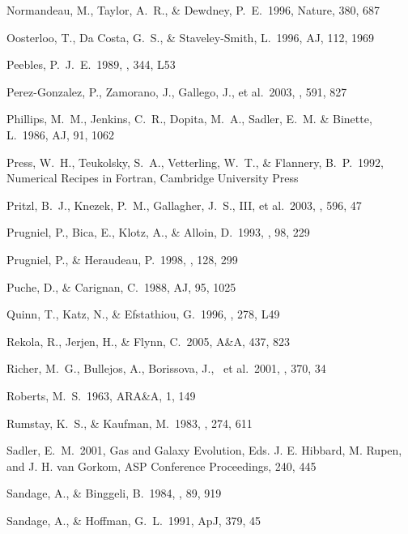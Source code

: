 \documentclass[12pt,onecolumn]{emulateapj}
\begin{document}
\begin{thebibliography}{}
Normandeau, M., Taylor, A.~R., \& Dewdney, P.~E.\ 1996, Nature, 380, 687

Oosterloo, T., Da Costa, G.~S., \& Staveley-Smith, L.\ 1996, AJ, 112, 1969

Peebles, P.~J.~E.\ 1989, \apjl, 344, L53 

Perez-Gonzalez, P., Zamorano, J., Gallego, J., et al.\ 2003, \apj, 591, 827 

Phillips, M.~M., Jenkins, C.~R., Dopita, M.~A., Sadler, E.~M. \& Binette, L.\ 1986, AJ, 91, 1062

Press, W.~H., Teukolsky, S.~A., Vetterling, W.~T., \& Flannery, B.~P.\ 1992,
Numerical Recipes in Fortran, Cambridge University Press

Pritzl, B.~J., Knezek, P.~M., Gallagher, J.~S., III, et al.\ 2003, \apj, 596, 47

Prugniel, P., Bica, E., Klotz, A., \& Alloin, D.\ 1993, \aaps, 98, 229 

Prugniel, P., \& Heraudeau, P.\ 1998, \aaps, 128, 299 

Puche, D., \& Carignan, C.\ 1988, AJ, 95, 1025

Quinn, T., Katz, N., \& Efstathiou, G.\ 1996, \mnras, 278, L49 

Rekola, R., Jerjen, H., \& Flynn, C.\ 2005, A\&A, 437, 823

Richer, M.~G., Bullejos, A., Borissova, J., ~et al.\ 2001, \aap, 370, 34 

Roberts, M.~S.\ 1963, ARA\&A, 1, 149

Rumstay, K.~S., \& Kaufman, M.\ 1983, \apj, 274, 611 

Sadler, E.~M.\ 2001, Gas and Galaxy Evolution, 
Eds. J. E. Hibbard, M. Rupen, and J. H. van Gorkom,
ASP Conference Proceedings, 240, 445 

Sandage, A., \& Binggeli, B.\ 1984, \aj, 89, 919

Sandage, A., \& Hoffman, G.~L.\ 1991, ApJ, 379, 45


\end{thebibliography}
\end{document}
